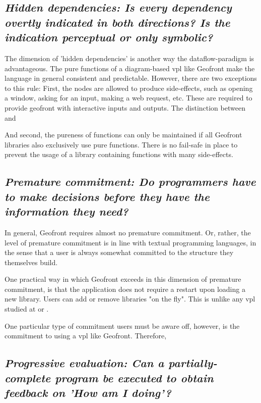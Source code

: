 \subsection*{\emph{Hidden dependencies: Is every dependency overtly indicated in both directions? Is the indication perceptual or only symbolic? }}

The dimension of 'hidden dependencies' is another way the dataflow-paradigm is advantageous. 
The pure functions of a diagram-based vpl like Geofront make the language in general consistent and predictable.
However, there are two exceptions to this rule:
First, the  nodes are allowed to produce side-effects, such as opening a window, asking for an input, making a web request, etc. 
These are required to provide geofront with interactive inputs and outputs.
The distinction between  and \m{}

And second, the pureness of functions can only be maintained if all Geofront libraries also exclusively use pure functions. 
There is no fail-safe in place to prevent the usage of a library containing functions with many side-effects. 

\subsection*{\emph{Premature commitment: Do programmers have to make decisions before they have the information they need? }}

In general, Geofront requires almost no premature commitment. 
Or, rather, the level of premature commitment is in line with textual programming languages, in the sense that a user is always somewhat committed to the structure they themselves build. 

One practical way in which Geofront exceeds in this dimension of premature commitment, is that the application does not require a restart upon loading a new library. 
Users can add or remove libraries "on the fly". 
This is unlike any vpl studied at  or .

One particular type of commitment users must be aware off, however, is the commitment to using a \ac{vpl} like Geofront. 
Therefore, 


\subsection*{\emph{Progressive evaluation: Can a partially-complete program be executed to obtain feedback on 'How am I doing'? }}

